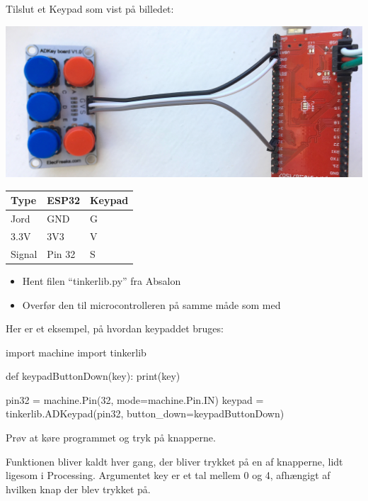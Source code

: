 \documentclass{ucph-handout}
\newcounter{handout}
\newcommand{\Ark}{Arbejdsark \arabic{handout}: }
\renewcommand{\Title}{\Ark LED-strip}%
\begin{document}
\newpage
{}
\renewcommand{\Title}{\Ark Keypad}
\begin{exercisebox}[adjusted title=Tilslut keypad]
  Tilslut et Keypad som vist på billedet:
  
\noindent
\begin{minipage}{0.65\linewidth}
\includegraphics[width=\textwidth]{illustrations/keypad-connection-cropped}
\end{minipage}
\begin{minipage}{0.20\linewidth}
\noindent
\begin{tabular}{lll}
  Type & ESP32 & Keypad \\
  \hline
 Jord & GND & G \\
 3.3V & 3V3 & V \\
 Signal & Pin 32 & S
\end{tabular}

\end{minipage}
\begin{itemize}
\item Hent filen ``tinkerlib.py'' fra Absalon
\item Overfør den til microcontrolleren på samme måde som med 
\end{itemize}
\end{exercisebox}

\begin{exercisebox}[adjusted title=Programmering af keypad]
Her er et eksempel, på hvordan keypaddet bruges:
\begin{python}
import machine
import tinkerlib

def keypadButtonDown(key):
    print(key)

pin32 = machine.Pin(32, mode=machine.Pin.IN)
keypad = tinkerlib.ADKeypad(pin32, button_down=keypadButtonDown)
\end{python}

\noindent
Prøv at køre programmet og tryk på knapperne.

\vspace{2mm}
\noindent
Funktionen  bliver kaldt hver gang, der bliver
trykket på en af knapperne, lidt ligesom  i
Processing. Argumentet key er et tal mellem 0 og 4, afhængigt af
hvilken knap der blev trykket på.
\end{exercisebox}
\end{document}
